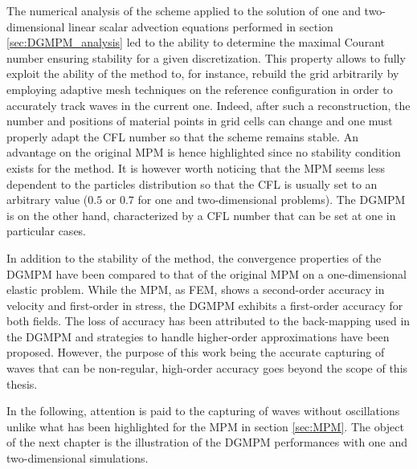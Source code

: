 The numerical analysis of the scheme applied to the solution of one and two-dimensional linear scalar advection equations performed in section \ref{sec:DGMPM_analysis} led to the ability to determine the maximal Courant number ensuring stability for a given discretization.
This property allows to fully exploit the ability of the method to, for instance, rebuild the grid arbitrarily by employing adaptive mesh techniques on the reference configuration in order to accurately track waves in the current one. Indeed, after such a reconstruction, the number and positions of material points in grid cells can change and one must properly adapt the CFL number so that the scheme remains stable. An advantage on the original MPM is hence highlighted since no stability condition exists for the method. It is however worth noticing that the MPM seems less dependent to the particles distribution so that the CFL is usually set to an arbitrary value ($0.5$ or $0.7$ for one and two-dimensional problems).
The DGMPM is on the other hand, characterized by a CFL number that can be set at one in particular cases.

In addition to the stability of the method, the convergence properties of the DGMPM have been compared to that of the original MPM on a one-dimensional elastic problem. While the MPM, as FEM, shows a second-order accuracy in velocity and first-order in stress, the DGMPM exhibits a first-order accuracy for both fields. The loss of accuracy has been attributed to the back-mapping used in the DGMPM and strategies to handle higher-order approximations have been proposed. However, the purpose of this work being the accurate capturing of waves that can be non-regular, high-order accuracy goes beyond the scope of this thesis.%

In the following, attention is paid to the capturing of waves without oscillations unlike what has been highlighted for the MPM in section \ref{sec:MPM}. The object of the next chapter is the illustration of the DGMPM performances with one and two-dimensional simulations.




